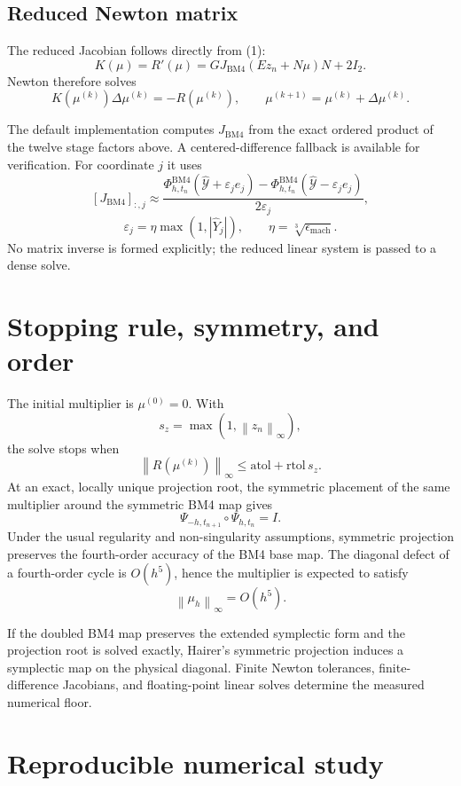 \documentclass[11pt,a4paper]{article}
\newcommand{\Id}{I}
\newcommand{\Y}{\mathcal{Y}}
\newcommand{\PhiBM}{\Phi^{\mathrm{BM4}}_{h,t_n}}
\newcommand{\norm}[1]{\left\lVert #1\right\rVert}
\begin{document}
\subsection*{Reduced Newton matrix}

The reduced Jacobian follows directly from (1):
\[
 \boxed{
 K(\mu)=R'(\mu)
 =GJ_{\mathrm{BM4}}(Ez_n+N\mu)N+2\Id_2.
 } \tag{3}
\]
Newton therefore solves
\[
 K(\mu^{(k)})\Delta\mu^{(k)}=-R(\mu^{(k)}),
 \qquad
 \mu^{(k+1)}=\mu^{(k)}+\Delta\mu^{(k)}.
\]

The default implementation computes $J_{\mathrm{BM4}}$ from the exact ordered
product of the twelve stage factors above.  A centered-difference fallback is
available for verification.  For coordinate $j$ it uses
\[
 [J_{\mathrm{BM4}}]_{:,j}
 \approx
 \frac{\PhiBM(\widehat{\Y}+\varepsilon_je_j)
       -\PhiBM(\widehat{\Y}-\varepsilon_je_j)}{2\varepsilon_j},
\]
\[
 \varepsilon_j
 =\eta\max(1,|\widehat{Y}_j|),
 \qquad
 \eta=\sqrt[3]{\epsilon_{\mathrm{mach}}}.
\]
No matrix inverse is formed explicitly; the reduced linear system is passed to
a dense solve.

\section{Stopping rule, symmetry, and order}

The initial multiplier is $\mu^{(0)}=0$.  With
\[
 s_z=\max(1,\norm{z_n}_\infty),
\]
the solve stops when
\[
 \norm{R(\mu^{(k)})}_\infty
 \leq \mathrm{atol}+\mathrm{rtol}\,s_z.
\]
At an exact, locally unique projection root, the symmetric placement of the same
multiplier around the symmetric BM4 map gives
\[
 \Psi_{-h,t_{n+1}}\circ\Psi_{h,t_n}=\Id.
\]
Under the usual regularity and non-singularity assumptions, symmetric projection
preserves the fourth-order accuracy of the BM4 base map.  The diagonal defect of
a fourth-order cycle is $O(h^5)$, hence the multiplier is expected to satisfy
\[
 \boxed{\norm{\mu_h}_\infty=O(h^5).}
\]

If the doubled BM4 map preserves the extended symplectic form and the projection
root is solved exactly, Hairer's symmetric projection induces a symplectic map on
the physical diagonal.  Finite Newton tolerances, finite-difference Jacobians,
and floating-point linear solves determine the measured numerical floor.

\section{Reproducible numerical study}
\end{document}
